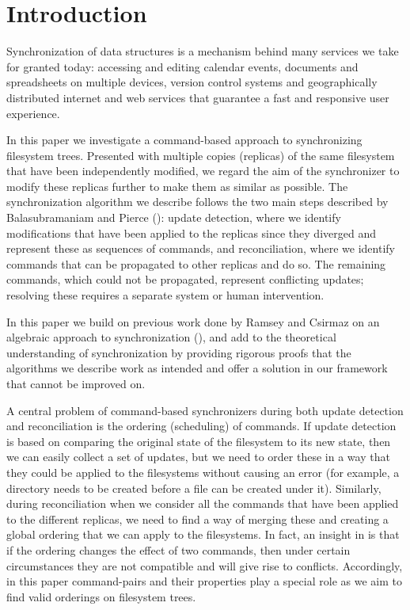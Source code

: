 
\section{Introduction}

Synchronization of data structures
is a mechanism behind many services we take for granted today:
accessing and editing calendar events, documents and spreadsheets
on multiple devices, version control systems and
geographically distributed internet and web services that
guarantee a fast and responsive user experience.

In this paper we investigate a command-based approach
to synchronizing filesystem trees.
Presented with multiple copies (replicas) of the same filesystem that have been independently modified,
we regard the aim of the synchronizer to modify these replicas further
to make them as similar as possible.
The synchronization algorithm we describe
follows the two main steps described by Balasubramaniam and Pierce (\cite{BP}):
update detection, where we identify modifications that have been applied to the replicas
since they diverged and represent these as sequences of commands,
and reconciliation, where we identify commands that can be propagated to other replicas and do so.
The remaining commands, which could not be propagated, represent conflicting updates;
resolving these requires a separate system or human intervention.

In this paper we build on previous work done 
by Ramsey and Csirmaz
on an algebraic approach to synchronization
(\cite{NREC}),
and add to the theoretical understanding
of synchronization by providing rigorous proofs that the algorithms
we describe work as intended
and offer a solution in our framework that cannot be improved on.

A central problem of command-based synchronizers 
during both update detection and reconciliation
is the ordering (scheduling) of commands.
If update detection is based on comparing the original state of the filesystem
to its new state, then we can easily collect a set of updates,
but we need to order these in a way that they could be applied
to the filesystems without causing an error 
(for example, a directory needs to be created before a file can be created under it).
Similarly, during reconciliation when we consider all the commands that
have been applied to the different replicas, we need to find a way of
merging these and creating a global ordering that we can apply
to the filesystems.
In fact, an insight in \cite{NREC} is that
if the ordering changes the effect of two commands,
then under certain circumstances they are not compatible and will give rise to conflicts.
Accordingly, in this paper command-pairs and their properties
play a special role
as we aim to find valid orderings on filesystem trees.

